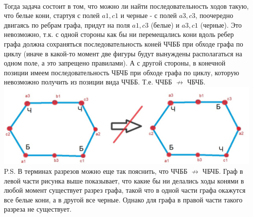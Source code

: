 \documentclass{article}
\begin{document}
\\
Тогда задача состоит в том, что можно ли найти последовательность ходов такую, что белые кони, стартуя с полей $a1,c1$ и черные - с полей $a3,c3$, поочередно двигаясь по ребрам графа, придут на поля $a1,c3$ (белые) и $a3,c1$ (черные). Это невозможно, т.к. с одной стороны как бы ни перемещались кони вдоль ребер графа должна сохраняться последовательность коней ЧЧББ при обходе графа по циклу (иначе в какой-то момент две фигуры будут вынуждены располагаться на одном поле, а это запрещено правилами). А с другой стороны, в конечной позиции имеем последовательность ЧБЧБ при обходе графа по циклу, которую невозможно получить из позиции вида ЧЧББ. Т.е. ЧЧББ  $\not \rightarrow$ ЧБЧБ.
\\
{\includegraphics[scale=0.4]{img/img6.jpg}}
\\
P.S. В терминах разрезов можно еще так пояснить, что ЧЧББ  $\not \rightarrow$ ЧБЧБ. Граф в левой части рисунка выше показывает, что какие бы ни делались ходы конями в любой момент существует разрез графа, такой что в одной части графа окажутся все белые кони, а в другой все черные. Однако для графа в правой части такого разреза не существует.
\end{document}
